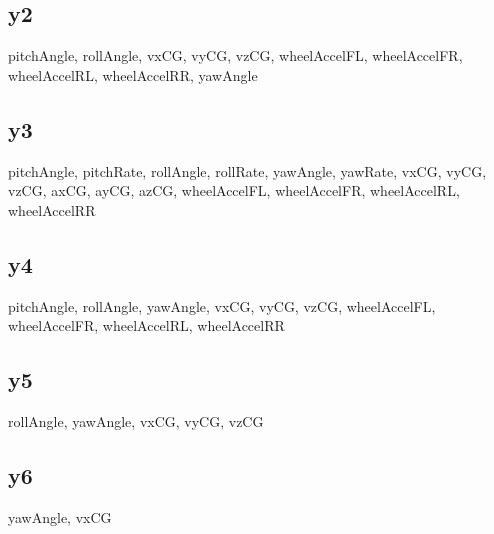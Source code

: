 \documentclass{article}
\begin{document}
\begin{appendices}
\subsection{y2}
\label{appendix:datay2}
pitchAngle, rollAngle, vxCG, vyCG, vzCG, wheelAccelFL, wheelAccelFR, wheelAccelRL, wheelAccelRR, yawAngle
\subsection{y3}
\label{appendix:datay3}
pitchAngle, pitchRate, rollAngle, rollRate, yawAngle, yawRate, vxCG, vyCG, vzCG, axCG, ayCG, azCG, wheelAccelFL, wheelAccelFR, wheelAccelRL, wheelAccelRR
\subsection{y4}
\label{appendix:datay4}
pitchAngle, rollAngle, yawAngle, vxCG, vyCG, vzCG, wheelAccelFL, wheelAccelFR, wheelAccelRL, wheelAccelRR
\subsection{y5}
\label{appendix:datay5}
rollAngle, yawAngle, vxCG, vyCG, vzCG
\subsection{y6}
\label{appendix:datay6}
yawAngle, vxCG

\end{appendices}
\end{document}
